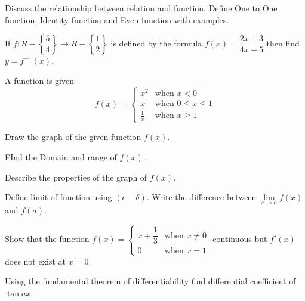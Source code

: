 \documentclass[12pt]{article}
\begin{document}
  \begin{itemize}
    {\large \linespread{2}
    \item[Q1.] 
      \begin{itemize}
        {\normalsize
        \item[a)] Discuss the relationship between relation and function. Define One to One function, Identity function and Even function with examples.
        \item[b)] If $f:R-\left\{ \dfrac{5}{4} \right\} \to R-\left\{ \dfrac{1}{2} \right\}$ is defined by the formula $f(x)=\dfrac{2x+3}{4x-5}$ then find $y=f^{-1}(x)$.
        \item[c)] A function is given-
        $$f(x) = 
          \begin{cases}
            x^2 & \text{when } x < 0 \\
            x & \text{when } 0 \leq x \leq 1 \\
            \frac{1}{x} & \text{when } x \geq 1
          \end{cases}$$
          \begin{itemize}
            {\large
            \item[i)] Draw the graph of the given function $f(x)$.
            \item[ii)] FInd the Domain and range of $f(x)$.
            \item[iii)] Describe the properties of the graph of $f(x)$.}
          \end{itemize}}
      \end{itemize}
    \item[Q2.] 
    \begin{itemize}
      {\large
      \item[a)] Define limit of function using $(\epsilon - \delta)$. Write the difference between $\lim \limits_{x \to a} f(x)$ and $f(a)$.
      \item[b)] Show that the function 
          $f(x) = 
          \begin{cases}
            x+\dfrac{1}{3} & \text{when } x \neq 0 \\
            0 & \text{when } x = 1
          \end{cases}$ continuous but $f'(x)$ does not exist at $x=0$.
      \item[c)] Using the fundamental theorem of differentiability find differential coefficient of $\tan ax$.}
    \end{itemize}
    \item[Q3.] 
    \begin{itemize}

\end{itemize}}
\end{itemize}
\end{document}
